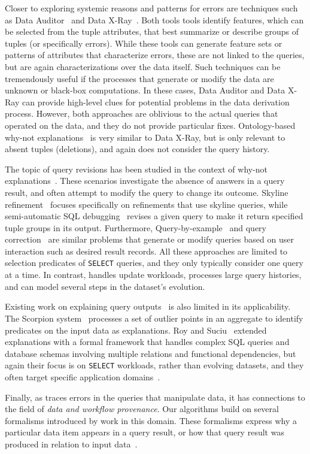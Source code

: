 Closer to exploring systemic reasons and patterns for errors are
techniques such as Data Auditor~\cite{GolabKKS10, Golab2008
} and Data
X-Ray~\cite{wang2015}. Both tools tools identify features, which can
be selected from the tuple attributes, that best summarize or describe
groups of tuples (or specifically errors). While these tools can
generate feature sets or patterns of attributes that characterize
errors, these are not linked to the queries, but are again
characterizations over the data itself. Such techniques can be
tremendously useful if the processes that generate or modify the data
are unknown or black-box computations. In these cases, Data Auditor
and Data X-Ray can provide high-level clues for potential problems in
the data derivation process. However, both approaches are oblivious to
the actual queries that operated on the data, and they do not provide
particular fixes. Ontology-based why-not
explanations~\cite{tenCate2015} is very similar to Data X-Ray, but is
only relevant to absent tuples (deletions), and again does not
consider the query history.

The topic of query revisions has been studied in the context of
why-not explanations~\cite{Chapman2009}. These scenarios investigate
the absence of answers in a query result, and often attempt to modify
the query to change its outcome. Skyline
refinement~\cite{tran2010conquer} focuses specifically on refinements
that use skyline queries, while semi-automatic SQL
debugging~\cite{tzompanaki14semi} revises a given query to make it
return specified tuple groups in its output.  Furthermore, Query-by-example~\cite{zloof1977query} 
and query correction~\cite{abouzied2012dataplay} are similar problems that generate or modify
queries based on user interaction such as desired result records.
All these approaches are
limited to selection predicates of \texttt{SELECT} queries, and they
only typically consider one query at a time. In contrast, \sys handles
update workloads, processes large query histories, and can model
several steps in the dataset's evolution.

Existing work on explaining query outputs~\cite{GebalyAGKS14} is also
limited in its applicability. The Scorpion system~\cite{Wu13}
processes a set of outlier points in an aggregate to identify
predicates on the input data as explanations. Roy and
Suciu~\cite{Roy2014} extended explanations with a formal framework
that handles complex SQL queries and database schemas involving
multiple relations and functional dependencies, but again their focus
is on \texttt{SELECT} workloads, rather than evolving datasets, and
they often target specific application domains~\cite{Khoussainova2012, Thirumuruganathan2012, Das2011, Fabbri2011, Bender14
}.

Finally, as \sys traces errors in the queries that manipulate data, it
has connections to the field of \emph{data and workflow provenance}.
Our algorithms build on several formalisms introduced by work in this
domain. These formalisms express why a particular data item appears in
a query result, or how that query result was produced in relation to
input data~\cite{BunemanKT01,GKT07-semirings, CheneyCT09, CuiWW00
}.


